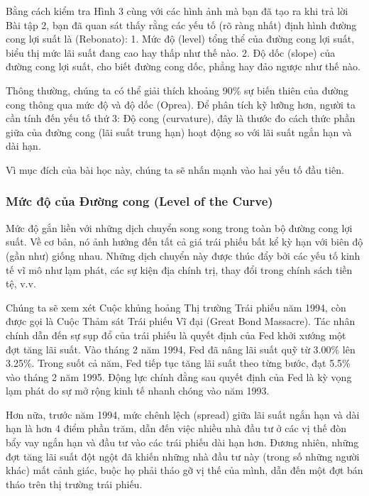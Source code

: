 Bằng cách kiểm tra Hình 3 cùng với các hình ảnh mà bạn đã tạo ra khi trả lời Bài tập 2, bạn đã quan sát thấy rằng các yếu tố (rõ ràng nhất) định hình đường cong lợi suất là (Rebonato):
1. Mức độ (level) tổng thể của đường cong lợi suất, biểu thị mức lãi suất đang cao hay thấp như thế nào.
2. Độ dốc (slope) của đường cong lợi suất, cho biết đường cong dốc, phẳng hay đảo ngược như thế nào.

Thông thường, chúng ta có thể giải thích khoảng 90\% sự biến thiên của đường cong thông qua mức độ và độ dốc (Oprea). Để phân tích kỹ lưỡng hơn, người ta cần tính đến yếu tố thứ 3: Độ cong (curvature), đây là thước đo cách thức phần giữa của đường cong (lãi suất trung hạn) hoạt động so với lãi suất ngắn hạn và dài hạn.

Vì mục đích của bài học này, chúng ta sẽ nhấn mạnh vào hai yếu tố đầu tiên.

\subsubsection[Mức độ của Đường cong]{Mức độ của Đường cong (Level of the Curve)}

Mức độ gắn liền với những dịch chuyển song song trong toàn bộ đường cong lợi suất. Về cơ bản, nó ảnh hưởng đến tất cả giá trái phiếu bất kể kỳ hạn với biên độ (gần như) giống nhau. Những dịch chuyển này được thúc đẩy bởi các yếu tố kinh tế vĩ mô như lạm phát, các sự kiện địa chính trị, thay đổi trong chính sách tiền tệ, v.v.

Chúng ta sẽ xem xét Cuộc khủng hoảng Thị trường Trái phiếu năm 1994, còn được gọi là Cuộc Thảm sát Trái phiếu Vĩ đại (Great Bond Massacre). Tác nhân chính dẫn đến sự sụp đổ của trái phiếu là quyết định của Fed khởi xướng một đợt tăng lãi suất. Vào tháng 2 năm 1994, Fed đã nâng lãi suất quỹ từ 3.00\% lên 3.25\%. Trong suốt cả năm, Fed tiếp tục tăng lãi suất theo từng bước, đạt 5.5\% vào tháng 2 năm 1995. Động lực chính đằng sau quyết định của Fed là kỳ vọng lạm phát do sự mở rộng kinh tế nhanh chóng vào năm 1993.

Hơn nữa, trước năm 1994, mức chênh lệch (spread) giữa lãi suất ngắn hạn và dài hạn là hơn 4 điểm phần trăm, dẫn đến việc nhiều nhà đầu tư ở các vị thế đòn bẩy vay ngắn hạn và đầu tư vào các trái phiếu dài hạn hơn. Đương nhiên, những đợt tăng lãi suất đột ngột đã khiến những nhà đầu tư này (trong số những người khác) mất cảnh giác, buộc họ phải tháo gỡ vị thế của mình, dẫn đến một đợt bán tháo trên thị trường trái phiếu.

